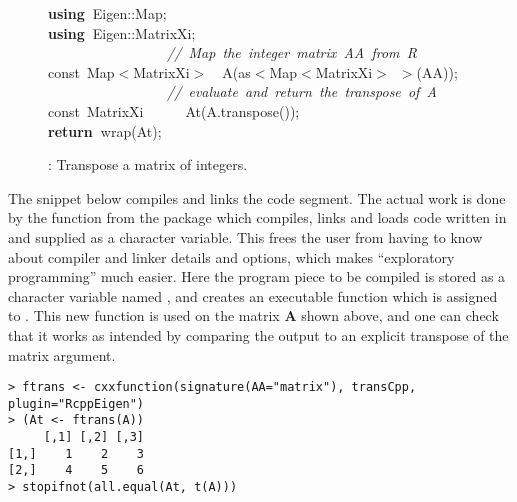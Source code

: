 \documentclass[shortnames,article]{jss}
\newcommand{\hlstd}[1]{\textcolor[rgb]{0,0,0}{#1}}
\newcommand{\hlslc}[1]{\textcolor[rgb]{0.67,0.13,0.13}{\it{#1}}}
\newcommand{\hlsym}[1]{\textcolor[rgb]{0,0,0}{#1}}
\newcommand{\hlkwa}[1]{\textcolor[rgb]{0.61,0.13,0.93}{\bf{#1}}}
\newcommand{\hlkwb}[1]{\textcolor[rgb]{0.13,0.54,0.13}{#1}}
\newcommand{\hlkwd}[1]{\textcolor[rgb]{0,0,0}{#1}}
\begin{document}
\begin{figure}[htb]
    \noindent
    \ttfamily
    \hlstd{}\hlkwa{using\ }\hlstd{Eigen}\hlsym{::}\hlstd{Map}\hlsym{;}\hspace*{\fill}\\
    \hlstd{}\hlkwa{using\ }\hlstd{Eigen}\hlsym{::}\hlstd{MatrixXi}\hlsym{;}\hspace*{\fill}\\
    \hlstd{}\hlstd{\ \ \ \ \ \ \ \ \ \ \ \ \ \ \ \ \ }\hlstd{}\hlslc{//\ Map\ the\ integer\ matrix\ AA\ from\ R}\hspace*{\fill}\\
    \hlstd{}\hlkwb{const\ }\hlstd{Map}\hlsym{$<$}\hlstd{MatrixXi}\hlsym{$>$}\hlstd{\ \ }\hlsym{}\hlstd{}\hlkwd{A}\hlstd{}\hlsym{(}\hlstd{as}\hlsym{$<$}\hlstd{Map}\hlsym{$<$}\hlstd{MatrixXi}\hlsym{$>$\ $>$(}\hlstd{AA}\hlsym{));}\hspace*{\fill}\\
    \hlstd{}\hlstd{\ \ \ \ \ \ \ \ \ \ \ \ \ \ \ \ \ }\hlstd{}\hlslc{//\ evaluate\ and\ return\ the\ transpose\ of\ A}\hspace*{\fill}\\
    \hlstd{}\hlkwb{const\ }\hlstd{MatrixXi}\hlstd{\ \ \ \ \ \ }\hlstd{}\hlkwd{At}\hlstd{}\hlsym{(}\hlstd{A}\hlsym{.}\hlstd{}\hlkwd{transpose}\hlstd{}\hlsym{());}\hspace*{\fill}\\
    \hlstd{}\hlkwa{return\ }\hlstd{}\hlkwd{wrap}\hlstd{}\hlsym{(}\hlstd{At}\hlsym{);}\hlstd{}\hspace*{\fill}
    \normalfont
  \caption{: Transpose a matrix of integers.}
  \label{trans}
\end{figure}

The  snippet below compiles and links the  code
segment. The actual work is done by the function  from the 
package which compiles, links and loads code written in  and
supplied as a character variable.  This frees the user from having to know about
compiler and linker details and options, which makes ``exploratory
programming'' much easier.  Here the program piece to be compiled is stored
as a character variable named , and  creates
an executable function which is assigned to .  This new function
is used on the matrix $\bm A$ shown above, and one can check that it works as intended
by comparing the output to an explicit transpose of the matrix argument.
\begin{verbatim}
> ftrans <- cxxfunction(signature(AA="matrix"), transCpp, plugin="RcppEigen")
> (At <- ftrans(A))
     [,1] [,2] [,3]
[1,]    1    2    3
[2,]    4    5    6
> stopifnot(all.equal(At, t(A)))
\end{verbatim}
\end{document}
